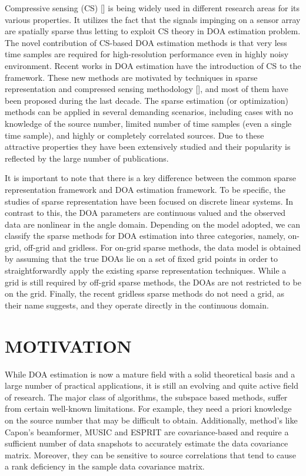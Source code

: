 \documentclass[12pt,a4paper]{article}
\theoremstyle{plain}
\theoremstyle{definition}
\begin{document}
Compressive sensing (CS) [\citet{R8,R9}] is being widely used in different research areas for its various properties. It utilizes the fact that the signals impinging on a sensor array are spatially sparse thus letting to exploit CS theory in DOA estimation problem. The novel contribution of CS-based DOA estimation methods is that very less time samples are required for high-resolution performance even in highly noisy environment. Recent works in DOA estimation have the introduction of CS to the framework. These new methods are motivated by techniques in sparse representation and compressed sensing methodology [\citet{R10,R11,R12}], and most of them have been proposed during the last decade. The sparse estimation (or optimization) methods can be applied in several demanding scenarios, including cases with no knowledge of the source number, limited number of time samples (even a single time sample), and highly or completely correlated sources. Due to these attractive properties they have been extensively studied and their popularity is reflected by the large number of publications.

It is important to note that there is a key difference between the common sparse representation framework and DOA estimation framework. To be specific, the studies of sparse representation have been focused on discrete linear systems. In contrast to this, the DOA parameters are continuous valued and the observed data are nonlinear in the angle domain. Depending on the model adopted, we can classify the sparse methods for DOA estimation into three categories, namely, on-grid, off-grid and gridless. For on-grid sparse methods, the data model is obtained by assuming that the true DOAs lie on a set of fixed grid points in order to straightforwardly apply the existing sparse representation techniques. While a grid is still required by off-grid sparse methods, the DOAs are not restricted to be on the grid. Finally, the recent gridless sparse methods do not need a grid, as their name suggests, and they operate directly in the continuous domain.

\section{MOTIVATION}
While DOA estimation is now a mature field with a solid theoretical basis and a large number of practical applications, it is still an evolving and quite active field of research. The major class of algorithms, the subspace based methods, suffer from certain well-known limitations. For example, they need a priori knowledge on the source number that may be difficult to obtain. Additionally, method's like Capon’s beamformer, MUSIC and ESPRIT are covariance-based and require a sufficient number of data snapshots to accurately estimate the data covariance matrix. Moreover, they can be sensitive to source correlations that tend to cause a rank deficiency in the sample data covariance matrix.
\end{document}

